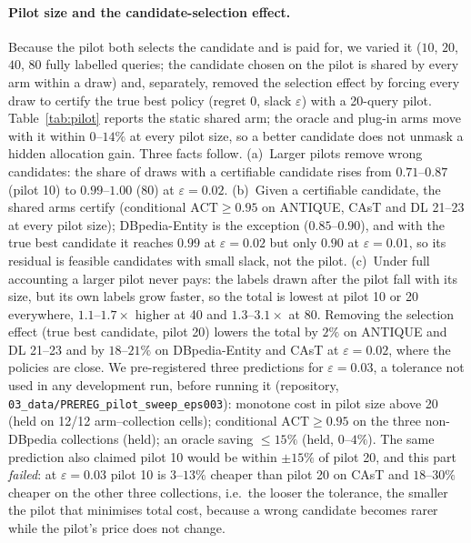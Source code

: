\documentclass{article}
\newcommand{\eps}{\varepsilon}
\newcommand{\ACT}{\mathrm{ACT}}
\begin{document}
\paragraph{Pilot size and the candidate-selection effect.} Because the pilot both selects the candidate and is paid for, we varied it ($10$, $20$, $40$, $80$ fully labelled queries; the candidate chosen on the pilot is shared by every arm within a draw) and, separately, removed the selection effect by forcing every draw to certify the true best policy (regret $0$, slack $\eps$) with a 20-query pilot. Table~\ref{tab:pilot} reports the static shared arm; the oracle and plug-in arms move with it within $0$--$14\%$ at every pilot size, so a better candidate does not unmask a hidden allocation gain. Three facts follow. (a)~Larger pilots remove wrong candidates: the share of draws with a certifiable candidate rises from $0.71$--$0.87$ (pilot 10) to $0.99$--$1.00$ (80) at $\eps=0.02$. (b)~Given a certifiable candidate, the shared arms certify (conditional $\ACT\ge0.95$ on ANTIQUE, CAsT and DL 21--23 at every pilot size); DBpedia-Entity is the exception ($0.85$--$0.90$), and with the true best candidate it reaches $0.99$ at $\eps=0.02$ but only $0.90$ at $\eps=0.01$, so its residual is feasible candidates with small slack, not the pilot. (c)~Under full accounting a larger pilot never pays: the labels drawn after the pilot fall with its size, but its own labels grow faster, so the total is lowest at pilot 10 or 20 everywhere, $1.1$--$1.7\times$ higher at 40 and $1.3$--$3.1\times$ at 80. Removing the selection effect (true best candidate, pilot 20) lowers the total by $2\%$ on ANTIQUE and DL 21--23 and by $18$--$21\%$ on DBpedia-Entity and CAsT at $\eps=0.02$, where the policies are close. We pre-registered three predictions for $\eps=0.03$, a tolerance not used in any development run, before running it (repository, \texttt{03\_data/PREREG\_pilot\_sweep\_eps003}): monotone cost in pilot size above 20 (held on 12/12 arm--collection cells); conditional $\ACT\ge0.95$ on the three non-DBpedia collections (held); an oracle saving $\le15\%$ (held, $0$--$4\%$). The same prediction also claimed pilot 10 would be within $\pm15\%$ of pilot 20, and this part \emph{failed}: at $\eps=0.03$ pilot 10 is $3$--$13\%$ cheaper than pilot 20 on CAsT and $18$--$30\%$ cheaper on the other three collections, i.e.\ the looser the tolerance, the smaller the pilot that minimises total cost, because a wrong candidate becomes rarer while the pilot's price does not change.
\end{document}
